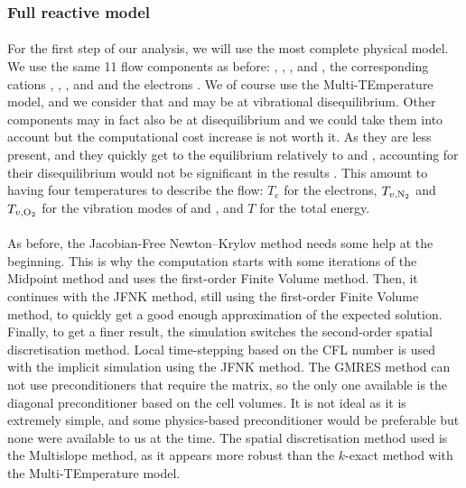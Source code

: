       \subsubsection{Full reactive model}

        \paragraph{}
        For the first step of our analysis, we will use the most complete physical model.
        We use the same 11 flow components as before: , , ,  and , the corresponding cations , , ,  and  and the electrons .
        We of course use the Multi-TEmperature model, and we consider that  and  may be at vibrational disequilibrium.
        Other components may in fact also be at disequilibrium and we could take them into account but the computational cost increase is not worth it.
        As they are less present, and they quickly get to the equilibrium relatively to  and , accounting for their disequilibrium would not be significant in the results \cite{Park2006}.
        This amount to having four temperatures to describe the flow: $T_e$ for the electrons, $T_{v, \ce{N_2}}$ and $T_{v, \ce{O_2}}$ for the vibration modes of  and , and $T$ for the total energy.

        \paragraph{}
        As before, the Jacobian-Free Newton--Krylov method needs some help at the beginning.
        This is why the computation starts with some iterations of the Midpoint method and uses the first-order Finite Volume method.
        Then, it continues with the JFNK method, still using the first-order Finite Volume method, to quickly get a good enough approximation of the expected solution.
        Finally, to get a finer result, the simulation switches the second-order spatial discretisation method.
        Local time-stepping based on the CFL number is used with the implicit simulation using the JFNK method.
        The GMRES method can not use preconditioners that require the matrix, so the only one available is the diagonal preconditioner based on the cell volumes.
        It is not ideal as it is extremely simple, and some physics-based preconditioner would be preferable \cite{KnollKeyes2004} but none were available to us at the time.
        The spatial discretisation method used is the Multislope method, as it appears more robust than the $k$-exact method with the Multi-TEmperature model.

